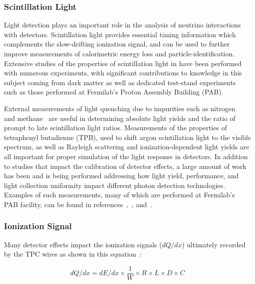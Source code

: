 \subsubsection{Scintillation Light}
Light detection plays an important role in the analysis of neutrino interactions with  detectors. Scintillation light provides essential timing information which complements the slow-drifting ionization signal, and can be used to further improve measurements of calorimetric energy loss and particle-identification. Extensive studies of the properties of scintillation light in  have been performed with numerous experiments, with significant contributions to knowledge in this subject coming from dark matter as well as dedicated test-stand experiments such as those performed at Fermilab's Proton Assembly Building (PAB). 

External measurements of light quenching due to impurities such as nitrogen~\cite{Acciarri:2008kv} and 
methane~\cite{Jones:2013mfa} are useful in determining absolute light yields and the ratio of prompt to late scintillation light ratios. Measurements of the properties of tetraphenyl butadienne (TPB), used to shift argon scintillation light to the visible spectrum, as well as Rayleigh scattering and ionization-dependent light yields are all important for proper simulation of the light response in  detectors. In addition to studies that impact the calibration of detector effects, a large amount of work has been and is being performed addressing how light yield, performance, and light collection uniformity impact different photon detection %
technologies. Examples of such measurements, many of which are performed at Fermilab's PAB facility, can be found in references~\cite{Cancelo:2018dnf},~\cite{Moss:2016yhb}, and~\cite{Moss:2014ota}.

\subsubsection{Ionization Signal}
Many detector effects impact the ionization signals ($dQ/dx$) ultimately recorded by the TPC wires as shown in this equation~\cite{Acciarri:2013met}:

\begin{equation}
dQ/dx = dE/dx \times \frac{1}{W} \times R \times L \times D \times C
\end{equation}

